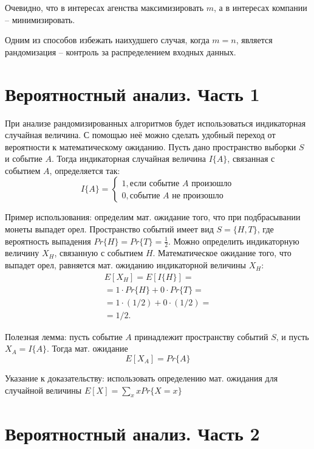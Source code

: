 \documentclass[11pt]{article}
\begin{document}
Очевидно, что в интересах агенства максимизировать $m$, а в интересах компании -- минимизировать.

Одним из способов избежать наихудшего случая, когда $m = n$, является рандомизация -- контроль
за распределением входных данных.

\section{Вероятностный анализ. Часть 1}

При анализе рандомизированных алгоритмов будет использоваться индикаторная случайная величина.
С помощью неё можно сделать удобный переход от вероятности к математическому ожиданию.
Пусть дано пространство выборки $S$ и событие $A$.
Тогда индикаторная случайная величина $I\{A\}$, связанная с событием $A$, определяется так:
\begin{equation*}
	I\{A\} = \begin{cases}
		1, \text{если событие $A$ произошло} \\
		0, \text{событие $A$ не произошло}
	\end{cases}
\end{equation*}

Пример использования: определим мат. ожидание того, что при подбрасывании монеты выпадет орел.
Пространство событий имеет вид $S = \{H, T\}$, где вероятность выпадения $Pr\{H\} = Pr\{T\} = \frac{1}{2}$.
Можно определить индикаторную величину $X_H$, связанную с событием $H$. Математическое ожидание того,
что выпадет орел, равняется мат. ожиданию индикаторной величины $X_H$:
\begin{align*}
	E[X_H] = E[I\{H\}] = \\
	= 1 \cdot Pr\{H\} + 0 \cdot Pr\{T\} = \\
	= 1 \cdot (1/2) + 0 \cdot (1/2) = \\
	= 1/2.
\end{align*}

Полезная лемма: пусть событие $A$ принадлежит пространству событий $S$, и пусть $X_A = I\{A\}$. Тогда мат. ожидание
\begin{equation}
E[X_A] = Pr\{A\}
\end{equation}

Указание к доказательству: использовать определению мат. ожидания для случайной величины $E[X] = \sum_x x Pr \{X = x\}$

\section{Вероятностный анализ. Часть 2}
\end{document}

